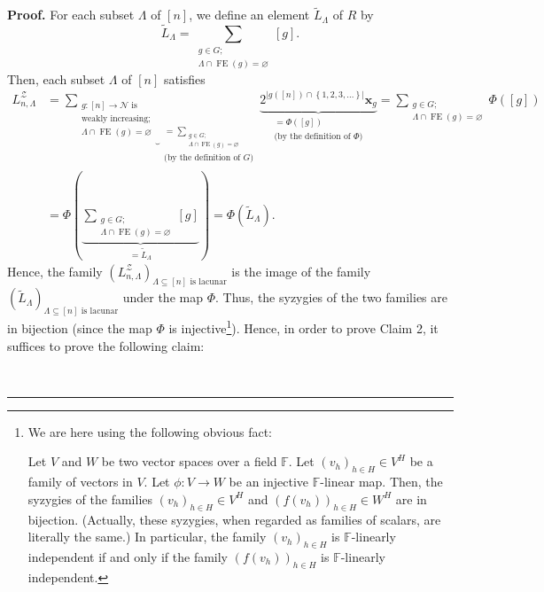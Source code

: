 \documentclass[numbers=enddot,12pt,final,onecolumn,notitlepage]{scrartcl}%
\theoremstyle{definition}
\newenvironment{proof}[1][Proof]{\noindent\textbf{#1.} }{\ \rule{0.5em}{0.5em}}
\let\sumnonlimits\sum
\renewcommand{\sum}{\sumnonlimits\limits}
\begin{document}
\begin{proof}
For each subset $\Lambda$ of $\left[  n\right]  $, we define an element
$\widetilde{L}_{\Lambda}$ of $R$ by%
\[
\widetilde{L}_{\Lambda}=\sum_{\substack{g\in G;\\\Lambda\cap\operatorname*{FE}%
\left(  g\right)  =\varnothing}}\left[  g\right]  .
\]
Then, each subset $\Lambda$ of $\left[  n\right]  $ satisfies%
\begin{align*}
L_{n,\Lambda}^{\mathcal{Z}}  &  =\underbrace{\sum_{\substack{g:\left[
n\right]  \rightarrow\mathcal{N}\text{ is}\\\text{weakly increasing;}%
\\\Lambda\cap\operatorname*{FE}\left(  g\right)  =\varnothing}}}%
_{\substack{=\sum_{\substack{g\in G;\\\Lambda\cap\operatorname*{FE}\left(
g\right)  =\varnothing}}\\\text{(by the definition of }G\text{)}%
}}\underbrace{2^{\left\vert g\left(  \left[  n\right]  \right)  \cap\left\{
1,2,3,\ldots\right\}  \right\vert }\mathbf{x}_{g}}_{\substack{=\Phi\left(
\left[  g\right]  \right)  \\\text{(by the definition of }\Phi\text{)}}%
}=\sum_{\substack{g\in G;\\\Lambda\cap\operatorname*{FE}\left(  g\right)
=\varnothing}}\Phi\left(  \left[  g\right]  \right) \\
&  =\Phi\left(  \underbrace{\sum_{\substack{g\in G;\\\Lambda\cap
\operatorname*{FE}\left(  g\right)  =\varnothing}}\left[  g\right]
}_{=\widetilde{L}_{\Lambda}}\right)  =\Phi\left(  \widetilde{L}_{\Lambda
}\right)  .
\end{align*}
Hence, the family $\left(  L_{n,\Lambda}^{\mathcal{Z}}\right)  _{\Lambda
\subseteq\left[  n\right]  \text{ is lacunar}}$ is the image of the family
$\left(  \widetilde{L}_{\Lambda}\right)  _{\Lambda\subseteq\left[  n\right]
\text{ is lacunar}}$ under the map $\Phi$. Thus, the syzygies of the two
families are in bijection (since the map $\Phi$ is injective\footnote{We are
here using the following obvious fact:
\par
Let $V$ and $W$ be two vector spaces over a field $\mathbb{F}$. Let $\left(
v_{h}\right)  _{h\in H}\in V^{H}$ be a family of vectors in $V$. Let
$\phi:V\rightarrow W$ be an injective $\mathbb{F}$-linear map. Then, the
syzygies of the families $\left(  v_{h}\right)  _{h\in H}\in V^{H}$ and
$\left(  f\left(  v_{h}\right)  \right)  _{h\in H}\in W^{H}$ are in bijection.
(Actually, these syzygies, when regarded as families of scalars, are literally
the same.) In particular, the family $\left(  v_{h}\right)  _{h\in H}$ is
$\mathbb{F}$-linearly independent if and only if the family $\left(  f\left(
v_{h}\right)  \right)  _{h\in H}$ is $\mathbb{F}$-linearly independent.}).
Hence, in order to prove Claim 2, it suffices to prove the following claim:


\end{proof}
\end{document}
